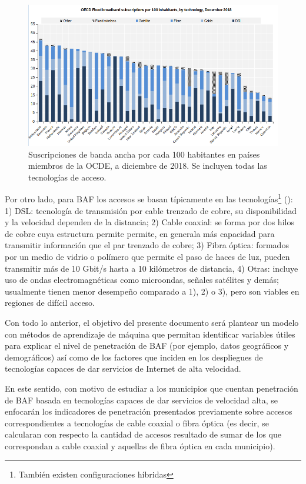 \documentclass[9pt,twocolumn,twoside]{ilcss}
\begin{document}
\begin{figure}[tbhp]
	\centering
	\includegraphics[width=1\linewidth]{images/ocde.png}
	\caption{Suscripciones de banda ancha por cada 100 habitantes en países miembros de la OCDE, a diciembre de 2018. Se incluyen todas las tecnologías de acceso.}
	\label{fig:ocde}
\end{figure}

Por otro lado, para BAF los accesos se basan típicamente en las tecnologías\footnote{También existen configuraciones híbridas} (\cite{moya2014telecomunicaciones}): 1) DSL: tecnología de transmisión por cable trenzado de cobre, su disponibilidad y la velocidad dependen de la distancia; 2) Cable coaxial: se forma por dos hilos de cobre cuya estructura permite permite, en generala más capacidad para transmitir información que el par trenzado de cobre; 3) Fibra óptica: formados por un medio de vidrio o polímero que permite el paso de haces de luz, pueden transmitir más de 10 Gbit/s hasta a 10 kilómetros de distancia, 4) Otras: incluye uso de ondas electromagnéticas como microondas, señales satélites y demás; usualmente  tienen menor desempeño comparado a 1), 2) o 3), pero son viables en regiones de difícil acceso.

Con todo lo anterior, el objetivo del presente documento será plantear un modelo con métodos de aprendizaje de máquina que permitan identificar variables útiles para explicar el nivel de penetración de BAF (por ejemplo, datos geográficos y demográficos) así como de los factores que inciden en los despliegues de tecnologías capaces de dar servicios de Internet de alta velocidad. 

En este sentido, con motivo de estudiar a los municipios que cuentan penetración de BAF basada en tecnologías capaces de dar servicios de velocidad alta, se enfocarán los indicadores de penetración presentados previamente sobre accesos correspondientes a tecnologías de cable coaxial o fibra óptica (es decir, se calcularan con respecto la cantidad de accesos resultado de sumar de los que correspondan a cable coaxial y aquellas de fibra óptica en cada municipio).
\end{document}
